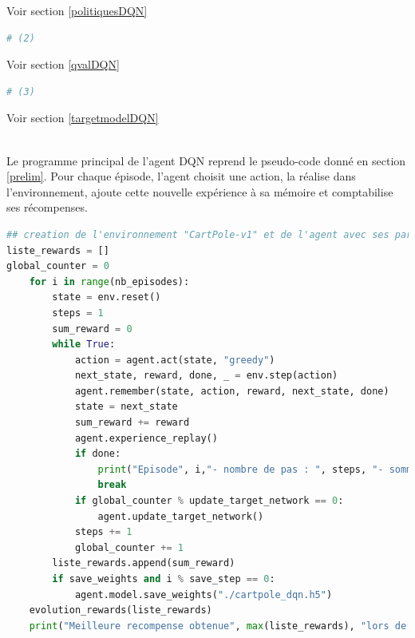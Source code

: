 \documentclass[10pt,a4paper]{article}
\begin{document}
Voir section \ref{politiquesDQN}

\begin{lstlisting}[language=Python]
# (2)
\end{lstlisting}

Voir section \ref{qvalDQN}

\begin{lstlisting}[language=Python]
# (3)
\end{lstlisting}

Voir section \ref{targetmodelDQN}

~\\

Le programme principal de l'agent DQN reprend le pseudo-code donné en section \ref{prelim}. Pour chaque épisode, l'agent choisit une action, la réalise dans l'environnement, ajoute cette nouvelle expérience à sa mémoire et comptabilise ses récompenses.
\begin{lstlisting}[language=Python, caption=Programme principal de l'agent DQN]
## creation de l'environnement "CartPole-v1" et de l'agent avec ses parametres
liste_rewards = []
global_counter = 0
    for i in range(nb_episodes):
        state = env.reset()
        steps = 1
        sum_reward = 0
        while True:
            action = agent.act(state, "greedy")
            next_state, reward, done, _ = env.step(action)
            agent.remember(state, action, reward, next_state, done)
            state = next_state
            sum_reward += reward
            agent.experience_replay()
            if done:
                print("Episode", i,"- nombre de pas : ", steps, "- somme recompenses", sum_reward)
                break
            if global_counter % update_target_network == 0:
                agent.update_target_network()
            steps += 1
            global_counter += 1
        liste_rewards.append(sum_reward)
        if save_weights and i % save_step == 0:
            agent.model.save_weights("./cartpole_dqn.h5")
    evolution_rewards(liste_rewards)
    print("Meilleure recompense obtenue", max(liste_rewards), "lors de l'episode", liste_rewards.index(max(liste_rewards)))
\end{lstlisting}
\end{document}
